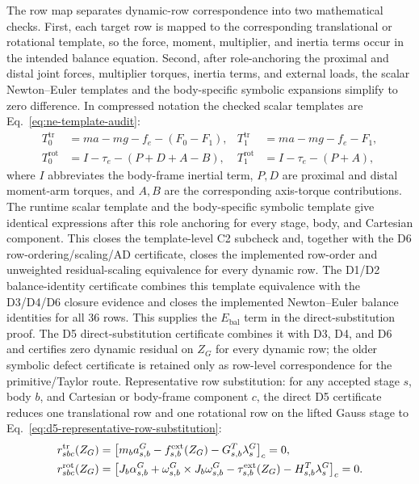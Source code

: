 \documentclass[preprint,12pt]{elsarticle}
\begin{document}
The row map separates dynamic-row correspondence into two mathematical checks.
First, each target row is mapped to the corresponding translational or
rotational template, so the force, moment, multiplier, and inertia terms occur
in the intended balance equation. Second, after role-anchoring the proximal
and distal joint forces, multiplier torques, inertia terms, and external
loads, the scalar Newton--Euler templates and the body-specific symbolic
expansions simplify to zero difference. In compressed notation the checked
scalar templates are Eq.~\eqref{eq:ne-template-audit}:
\begin{equation}
\begin{aligned}
T^{\mathrm{tr}}_0 &= ma-mg-f_e-(F_0-F_1), &
T^{\mathrm{tr}}_1 &= ma-mg-f_e-F_1,\\
T^{\mathrm{rot}}_0 &= I-\tau_e-(P+D+A-B), &
T^{\mathrm{rot}}_1 &= I-\tau_e-(P+A),
\end{aligned}
\label{eq:ne-template-audit}
\end{equation}
where $I$ abbreviates the body-frame inertial term, $P,D$ are proximal and
distal moment-arm torques, and $A,B$ are the corresponding axis-torque
contributions. The runtime scalar template and the body-specific symbolic
template give identical expressions after this role anchoring for every
stage, body, and Cartesian component. This closes the template-level C2
subcheck and, together with the D6 row-ordering/scaling/AD certificate, closes the
implemented row-order and unweighted residual-scaling equivalence for every
dynamic row. The D1/D2 balance-identity certificate combines this template
equivalence with the D3/D4/D6 closure evidence and closes the implemented
Newton--Euler balance identities for all 36 rows.  This supplies the
\(E_{\mathrm{bal}}\) term in the direct-substitution proof.  The D5
direct-substitution certificate combines it with D3, D4, and D6 and certifies
zero dynamic residual on \(Z_G\) for every dynamic row; the older symbolic
defect certificate is retained only as row-level correspondence for the
primitive/Taylor route.
Representative row substitution: for any accepted stage \(s\), body \(b\),
and Cartesian or body-frame component \(c\), the direct D5 certificate reduces
one translational row and one rotational row on the lifted Gauss stage to
Eq.~\eqref{eq:d5-representative-row-substitution}:
\begin{equation}
\label{eq:d5-representative-row-substitution}
\begin{aligned}
r^{\rm tr}_{sbc}(Z_G)
&=
\bigl[
m_b a^G_{s,b}
-f^{\rm ext}_{s,b}(Z_G)
-G_{s,b}^{T}\lambda^G_s
\bigr]_c
=0,\\
r^{\rm rot}_{sbc}(Z_G)
&=
\bigl[
J_b\alpha^G_{s,b}
+\omega^G_{s,b}\times J_b\omega^G_{s,b}
-\tau^{\rm ext}_{s,b}(Z_G)
-H_{s,b}^{T}\lambda^G_s
\bigr]_c
=0 .
\end{aligned}
\end{equation}
\end{document}
